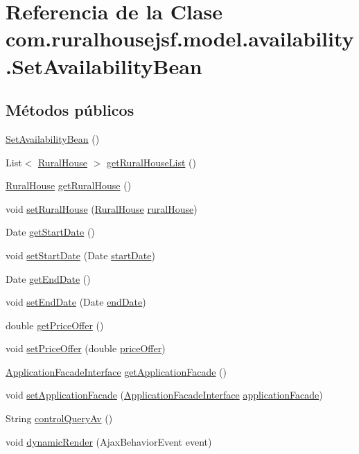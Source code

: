 \hypertarget{a00228}{}\section{Referencia de la Clase com.\+ruralhousejsf.\+model.\+availability.\+Set\+Availability\+Bean}
\label{a00228}
\subsection*{Métodos públicos}
\begin{DoxyCompactItemize}
\item 
\mbox{\hyperlink{a00228_a5eb9c427878e584a4850a8f48fcdbdb7}{Set\+Availability\+Bean}} ()
\item 
List$<$ \mbox{\hyperlink{a00188}{Rural\+House}} $>$ \mbox{\hyperlink{a00228_ad3d70e71d8eef84be13608ebdc45daa0}{get\+Rural\+House\+List}} ()
\item 
\mbox{\hyperlink{a00188}{Rural\+House}} \mbox{\hyperlink{a00228_a6fc1e11639074a665cb2413b6e873004}{get\+Rural\+House}} ()
\item 
void \mbox{\hyperlink{a00228_ac299020c526a3c4332cbd4e40b663b40}{set\+Rural\+House}} (\mbox{\hyperlink{a00188}{Rural\+House}} \mbox{\hyperlink{a00228_a38f4f2cc1f2c0647c1dea95c3e9c2fea}{rural\+House}})
\item 
Date \mbox{\hyperlink{a00228_a6da0cc3c2b9f138bb14fe20706b1d61d}{get\+Start\+Date}} ()
\item 
void \mbox{\hyperlink{a00228_a13be2b2f3e792278e1b1b45cdc3c2286}{set\+Start\+Date}} (Date \mbox{\hyperlink{a00228_a6962c301508cdd26f40a28468d59009c}{start\+Date}})
\item 
Date \mbox{\hyperlink{a00228_a6a42faf50c5cf766285bf4018c19d477}{get\+End\+Date}} ()
\item 
void \mbox{\hyperlink{a00228_a29c747d6a871c8c0f1eb3806461b1d32}{set\+End\+Date}} (Date \mbox{\hyperlink{a00228_a1620f454f1d1fe18418037a9490744cd}{end\+Date}})
\item 
double \mbox{\hyperlink{a00228_a264ab7e009d744abc40af63581bbdb05}{get\+Price\+Offer}} ()
\item 
void \mbox{\hyperlink{a00228_a89e2a4719579d3e5865dd940bf7c5649}{set\+Price\+Offer}} (double \mbox{\hyperlink{a00228_a3887b9317413abac9db351e53198f03b}{price\+Offer}})
\item 
\mbox{\hyperlink{a00136}{Application\+Facade\+Interface}} \mbox{\hyperlink{a00228_af9224c4f771a27c9e3c9218d1700bbcb}{get\+Application\+Facade}} ()
\item 
void \mbox{\hyperlink{a00228_ae9e4275c9099e9b5ccfdcc07a7592c65}{set\+Application\+Facade}} (\mbox{\hyperlink{a00136}{Application\+Facade\+Interface}} \mbox{\hyperlink{a00228_a1761e4ea575572afa2a495de5eadbd7b}{application\+Facade}})
\item 
String \mbox{\hyperlink{a00228_ae291ccc259e4e415f8ec7f52fb4a28da}{control\+Query\+Av}} ()
\item 
void \mbox{\hyperlink{a00228_aabfcb63b56f07d5d00cf4c44f413a6f8}{dynamic\+Render}} (Ajax\+Behavior\+Event event)
\end{DoxyCompactItemize}
